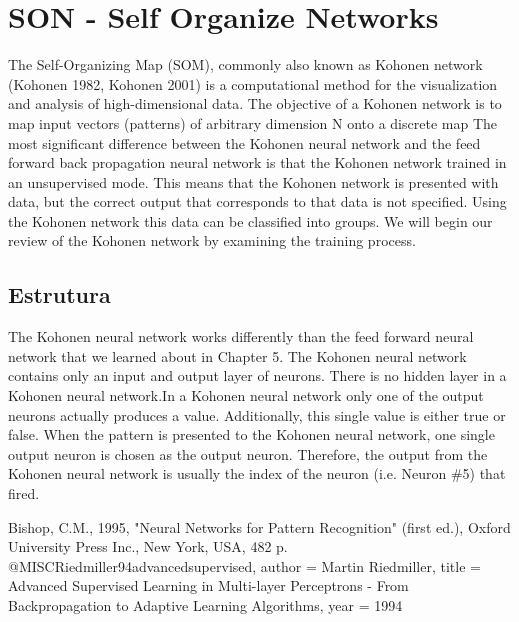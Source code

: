 \documentclass[
	article,			%
	11pt,				%
	oneside,			%
	a4paper,			%
	english,			%
	brazil,				%
	sumario=tradicional
	]{abntex2}
\begin{document}
\newpage

\section*{SON - Self Organize Networks} The Self-Organizing Map (SOM), commonly
also known as Kohonen network (Kohonen 1982, Kohonen 2001) is a computational
method for the visualization and analysis of high-dimensional data.
 The
objective of a Kohonen network is to map input vectors (patterns) of arbitrary
dimension N onto a discrete map The most significant difference between the
Kohonen neural network and the feed forward back propagation neural network is
that the Kohonen network trained in an unsupervised mode.
This means that the Kohonen network is presented with data, but the correct
output that corresponds to that data is not specified. Using the Kohonen network
this data can be classified into groups. We will begin our review of the Kohonen
network by examining the training process.
\subsection{Estrutura}
The Kohonen neural network works differently than the feed forward neural
network that we learned about in Chapter 5. The Kohonen neural network contains
only an input and output layer of neurons. There is no hidden layer in a Kohonen
neural network.In a Kohonen neural network only one of the output neurons
actually produces a value. Additionally, this single value is either true or
false. When the pattern is presented to the Kohonen neural network, one single
output neuron is chosen as the output neuron. Therefore, the output from the
Kohonen neural network is usually the index of the neuron (i.e. Neuron \#5) that
fired.



% 


\begin{citacao}

\end{citacao}




Bishop, C.M., 1995, "Neural Networks for Pattern Recognition" (first ed.),
Oxford University Press Inc., New York, USA, 482 p.
 @MISC{Riedmiller94advancedsupervised,
    author = {Martin Riedmiller},
    title = {Advanced Supervised Learning in Multi-layer Perceptrons - From Backpropagation to Adaptive Learning Algorithms},
    year = {1994}
}
\end{document}
